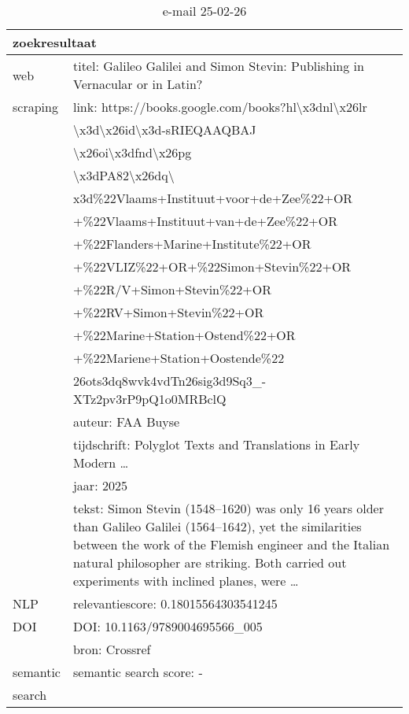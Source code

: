 \begin{table}[h!]
    \caption{e-mail 25-02-26}
    \centering
    \begin{tabularx}{\textwidth}{|p{4cm}|X|} 
        \hline
        \multicolumn{2}{|X|}{\textbf{zoekresultaat}} \\
        \hline
        web &titel: Galileo Galilei and Simon Stevin: Publishing in Vernacular or in Latin?\\
        scraping&link: https://books.google.com/books?hl\textbackslash x3dnl\textbackslash x26lr\\&\textbackslash x3d\textbackslash x26id\textbackslash x3d-sRIEQAAQBAJ\\&\textbackslash x26oi\textbackslash x3dfnd\textbackslash x26pg\\&\textbackslash x3dPA82\textbackslash x26dq\textbackslash \\&x3d\%22Vlaams+Instituut+voor+de+Zee\%22+OR\\&+\%22Vlaams+Instituut+van+de+Zee\%22+OR\\&+\%22Flanders+Marine+Institute\%22+OR\\&+\%22VLIZ\%22+OR+\%22Simon+Stevin\%22+OR\\&+\%22R/V+Simon+Stevin\%22+OR\\&+\%22RV+Simon+Stevin\%22+OR\\&+\%22Marine+Station+Ostend\%22+OR\\&+\%22Mariene+Station+Oostende\%22\\&\x26ots\x3dq8wvk4vdTn\x26sig\x3d9Sq3\_-XTz2pv3rP9pQ1o0MRBclQ\\
        &auteur: FAA Buyse\\
        &tijdschrift: Polyglot Texts and Translations in Early Modern …\\
        &jaar: 2025\\
        &tekst: Simon Stevin (1548–1620) was only 16 years older than Galileo Galilei (1564–1642), yet the similarities between the work of the Flemish engineer and the Italian natural philosopher are striking. Both carried out experiments with inclined planes, were …\\
        \hline
        NLP&relevantiescore: 0.18015564303541245\\
        \hline
        DOI&DOI: 10.1163/9789004695566\_005\\
        &bron: Crossref\\
        \hline
        semantic&semantic search score: -\\
        search&\\
        \hline
    \end{tabularx}
    \label{table:email20250226}
\end{table}
